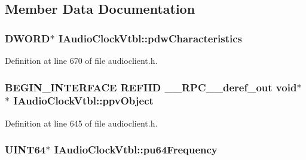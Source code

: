 \subsection{Member Data Documentation}
\subsubsection[{\texorpdfstring{pdw\+Characteristics}{pdwCharacteristics}}]{ {\bf D\+W\+O\+RD}$\ast$ I\+Audio\+Clock\+Vtbl\+::pdw\+Characteristics}\hypertarget{struct_i_audio_clock_vtbl_ace378c6c5b7862f015146a3581891dcc}{}\label{struct_i_audio_clock_vtbl_ace378c6c5b7862f015146a3581891dcc}


Definition at line 670 of file audioclient.\+h.

\subsubsection[{\texorpdfstring{ppv\+Object}{ppvObject}}]{\setlength{\rightskip}{0pt plus 5cm}B\+E\+G\+I\+N\+\_\+\+I\+N\+T\+E\+R\+F\+A\+CE {\bf R\+E\+F\+I\+ID} {\bf \+\_\+\+\_\+\+R\+P\+C\+\_\+\+\_\+deref\+\_\+out} {\bf void}$\ast$$\ast$ I\+Audio\+Clock\+Vtbl\+::ppv\+Object}\hypertarget{struct_i_audio_clock_vtbl_ab2d1d14b2a915f06f8153a3b85436a09}{}\label{struct_i_audio_clock_vtbl_ab2d1d14b2a915f06f8153a3b85436a09}


Definition at line 645 of file audioclient.\+h.

\subsubsection[{\texorpdfstring{pu64\+Frequency}{pu64Frequency}}]{ U\+I\+N\+T64$\ast$ I\+Audio\+Clock\+Vtbl\+::pu64\+Frequency}\hypertarget{struct_i_audio_clock_vtbl_a3cf7801c2293359f52ba908eb4454c0b}{}\label{struct_i_audio_clock_vtbl_a3cf7801c2293359f52ba908eb4454c0b}


